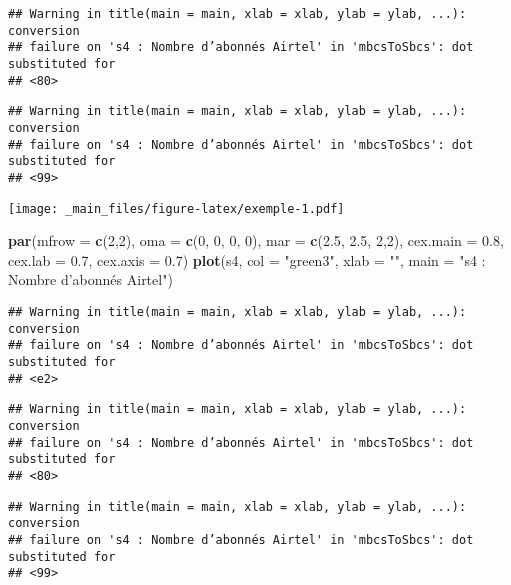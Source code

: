\documentclass[
]{book}
\newenvironment{Shaded}{\begin{snugshade}}{\end{snugshade}}
\newcommand{\AttributeTok}[1]{\textcolor[rgb]{0.13,0.29,0.53}{#1}}
\newcommand{\DecValTok}[1]{\textcolor[rgb]{0.00,0.00,0.81}{#1}}
\newcommand{\FloatTok}[1]{\textcolor[rgb]{0.00,0.00,0.81}{#1}}
\newcommand{\FunctionTok}[1]{\textcolor[rgb]{0.13,0.29,0.53}{\textbf{#1}}}
\newcommand{\NormalTok}[1]{#1}
\newcommand{\StringTok}[1]{\textcolor[rgb]{0.31,0.60,0.02}{#1}}
\theoremstyle{definition}
\theoremstyle{definition}
\theoremstyle{definition}
\theoremstyle{definition}
\theoremstyle{remark}
\begin{document}
\begin{verbatim}
## Warning in title(main = main, xlab = xlab, ylab = ylab, ...): conversion
## failure on 's4 : Nombre d’abonnés Airtel' in 'mbcsToSbcs': dot substituted for
## <80>
\end{verbatim}

\begin{verbatim}
## Warning in title(main = main, xlab = xlab, ylab = ylab, ...): conversion
## failure on 's4 : Nombre d’abonnés Airtel' in 'mbcsToSbcs': dot substituted for
## <99>
\end{verbatim}

\texttt{[image: \_main\_files/figure-latex/exemple-1.pdf]}

\begin{Shaded}
\begin{Highlighting}[]
\FunctionTok{par}\NormalTok{(}\AttributeTok{mfrow =} \FunctionTok{c}\NormalTok{(}\DecValTok{2}\NormalTok{,}\DecValTok{2}\NormalTok{), }\AttributeTok{oma =} \FunctionTok{c}\NormalTok{(}\DecValTok{0}\NormalTok{, }\DecValTok{0}\NormalTok{, }\DecValTok{0}\NormalTok{, }\DecValTok{0}\NormalTok{), }\AttributeTok{mar =} \FunctionTok{c}\NormalTok{(}\FloatTok{2.5}\NormalTok{, }\FloatTok{2.5}\NormalTok{, }\DecValTok{2}\NormalTok{,}\DecValTok{2}\NormalTok{), }\AttributeTok{cex.main =} \FloatTok{0.8}\NormalTok{, }\AttributeTok{cex.lab =} \FloatTok{0.7}\NormalTok{, }\AttributeTok{cex.axis =} \FloatTok{0.7}\NormalTok{)}
\FunctionTok{plot}\NormalTok{(s4, }\AttributeTok{col =} \StringTok{"green3"}\NormalTok{, }\AttributeTok{xlab =} \StringTok{""}\NormalTok{, }\AttributeTok{main =} \StringTok{"s4 : Nombre d’abonnés Airtel"}\NormalTok{)}
\end{Highlighting}
\end{Shaded}

\begin{verbatim}
## Warning in title(main = main, xlab = xlab, ylab = ylab, ...): conversion
## failure on 's4 : Nombre d’abonnés Airtel' in 'mbcsToSbcs': dot substituted for
## <e2>
\end{verbatim}

\begin{verbatim}
## Warning in title(main = main, xlab = xlab, ylab = ylab, ...): conversion
## failure on 's4 : Nombre d’abonnés Airtel' in 'mbcsToSbcs': dot substituted for
## <80>
\end{verbatim}

\begin{verbatim}
## Warning in title(main = main, xlab = xlab, ylab = ylab, ...): conversion
## failure on 's4 : Nombre d’abonnés Airtel' in 'mbcsToSbcs': dot substituted for
## <99>
\end{verbatim}
\end{document}
